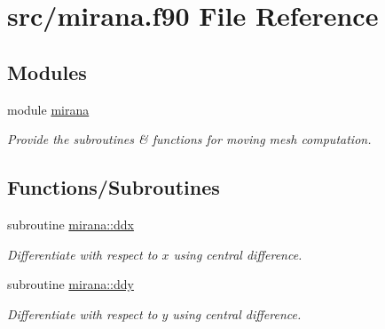 \hypertarget{mirana_8f90}{}\section{src/mirana.f90 File Reference}
\label{mirana_8f90}
\subsection*{Modules}
\begin{DoxyCompactItemize}
\item 
module \hyperlink{namespacemirana}{mirana}
\begin{DoxyCompactList}\small\item\em Provide the subroutines \& functions for moving mesh computation. \end{DoxyCompactList}\end{DoxyCompactItemize}
\subsection*{Functions/\+Subroutines}
\begin{DoxyCompactItemize}
\item 
subroutine \hyperlink{namespacemirana_aa7c8be04ce9179745b1a1e4562586da2}{mirana\+::ddx}
\begin{DoxyCompactList}\small\item\em Differentiate with respect to $x$ using central difference. \end{DoxyCompactList}\item 
subroutine \hyperlink{namespacemirana_a064528cec3b1c48cf653509ad7e48142}{mirana\+::ddy}
\begin{DoxyCompactList}\small\item\em Differentiate with respect to $y$ using central difference. \end{DoxyCompactList}\end{DoxyCompactItemize}
